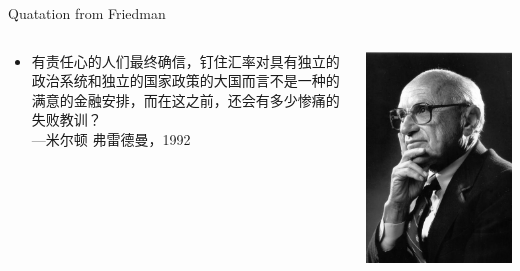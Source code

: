 \documentclass[10pt,hyperref={CJKbookmarks=true},xcolor=dvipsnames,aspectratio=169]{beamer}
\begin{document}
	
\begin{frame}{Quatation from Friedman}

\begin{columns}[onlytextwidth]
	\begin{column}{0.4\textwidth}
		\begin{itemize}
			\item 有责任心的人们最终确信，钉住汇率对具有独立的政治系统和独立的国家政策的大国而言不是一种的满意的金融安排，而在这之前，还会有多少惨痛的失败教训？\\
			---米尔顿 弗雷德曼，1992 
		\end{itemize}
	\end{column}
	\begin{column}{0.6\textwidth}
		\centering
		\includegraphics[scale=0.3]{fig/systems/friedman}
	\end{column}
\end{columns}

\end{frame}
\end{document}
